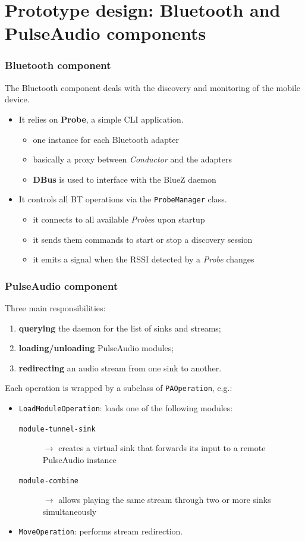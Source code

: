 \documentclass{beamer}
\begin{document}

\section[Prototype design]{Prototype design: Bluetooth and PulseAudio components}

\begin{frame}
\frametitle{Bluetooth component}
The Bluetooth component deals with the discovery and monitoring of the mobile device.
\begin{itemize}
	\item It relies on \textbf{Probe}, a simple CLI application.
	\begin{itemize}
		\item one instance for each Bluetooth adapter
		\item basically a proxy between \textsl{Conductor} and the adapters
		\item \textbf{DBus} is used to interface with the BlueZ daemon
	\end{itemize}
	\item It controls all BT operations via the \texttt{ProbeManager} class.
	\begin{itemize}
		\item it connects to all available \textsl{Probe}s upon startup
		\item it sends them commands to start or stop a discovery session
		\item it emits a signal when the RSSI detected by a \textsl{Probe} changes
	\end{itemize}
\end{itemize}
\end{frame}

\begin{frame}
\frametitle{PulseAudio component}
Three main responsibilities:
\begin{enumerate}
	\item \textbf{querying} the daemon for the list of sinks and streams;
	\item \textbf{loading/unloading} PulseAudio modules;
	\item \textbf{redirecting} an audio stream from one sink to another.
\end{enumerate}
\pause\vspace{2mm}
Each operation is wrapped by a subclass of \texttt{PAOperation}, e.g.:
\begin{itemize}
	\item \texttt{LoadModuleOperation}: loads one of the following modules:
	\begin{description}
		\item[\texttt{module-tunnel-sink}] $\rightarrow$ creates a virtual sink that forwards its input to a remote PulseAudio instance
		\item[\texttt{module-combine}] $\rightarrow$ allows playing the same stream through two or more sinks simultaneously
	\end{description}
	\item \texttt{MoveOperation}: performs stream redirection.
\end{itemize}
\end{frame}
\end{document}
